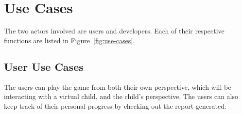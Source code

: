 \chapter{Use Cases} \label{use-cases} %

The two actors involved are users and developers. Each of their respective functions are listed in Figure~\ref{fig:use-cases}.

\section{User Use Cases}
The users can play the game from both their own perspective, which will be interacting with a virtual child, and the child's perspective. The users can also keep track of their personal progress by checking out the report generated.

\begin{table}[!ht]
\centering
\caption{Play as Parent Use Case}
\label{table:game-as-parent}
\vspace{5mm}
\end{table}

\begin{table}[!ht]
\centering
\caption{Play as Child Use Case}
\label{table:game-as-child}
\vspace{5mm}
\end{table}

